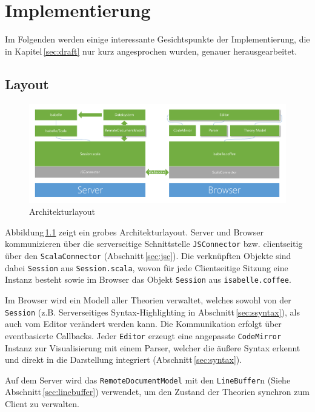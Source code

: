 \chapter{Implementierung}
\label{sec:imp}

Im Folgenden werden einige interessante Gesichtspunkte der Implementierung, die in
Kapitel\,\ref{sec:draft} nur kurz angesprochen wurden, genauer herausgearbeitet.

\section{Layout}
\label{sec:layout}

\begin{figure}[ht]
\includegraphics[width=\linewidth]{images/layout}
  \caption{Architekturlayout}
  \label{fig:layout}
\end{figure}

Abbildung\,\ref{fig:layout} zeigt ein grobes Architekturlayout. Server und Browser kommunizieren
über die serverseitige Schnittstelle \texttt{JSConnector} bzw. clientseitig über den
\texttt{ScalaConnector} (Abschnitt\,\ref{sec:jsc}). Die verknüpften Objekte sind dabei
\texttt{Session} aus \texttt{Session.scala}, wovon für jede Clientseitige Sitzung eine Instanz
besteht sowie im Browser das Objekt \texttt{Session} aus \texttt{isabelle.coffee}.

Im Browser wird ein Modell aller Theorien verwaltet, welches sowohl von der \texttt{Session} (z.B.
Serverseitiges Syntax-Highlighting in Abschnitt\,\ref{sec:ssyntax}), als auch vom Editor verändert
werden kann. Die Kommunikation erfolgt über eventbasierte Callbacks. Jeder \texttt{Editor} erzeugt
eine angepasste \texttt{CodeMirror} Instanz zur Visualisierung mit einem Parser, welcher die äußere
Syntax erkennt und direkt in die Darstellung integriert (Abschnitt\,\ref{sec:syntax}).

Auf dem Server wird das \texttt{RemoteDocumentModel} mit den \texttt{LineBuffer}n (Siehe
Abschnitt\,\ref{sec:linebuffer}) verwendet, um den Zustand der Theorien synchron zum Client zu
verwalten.


